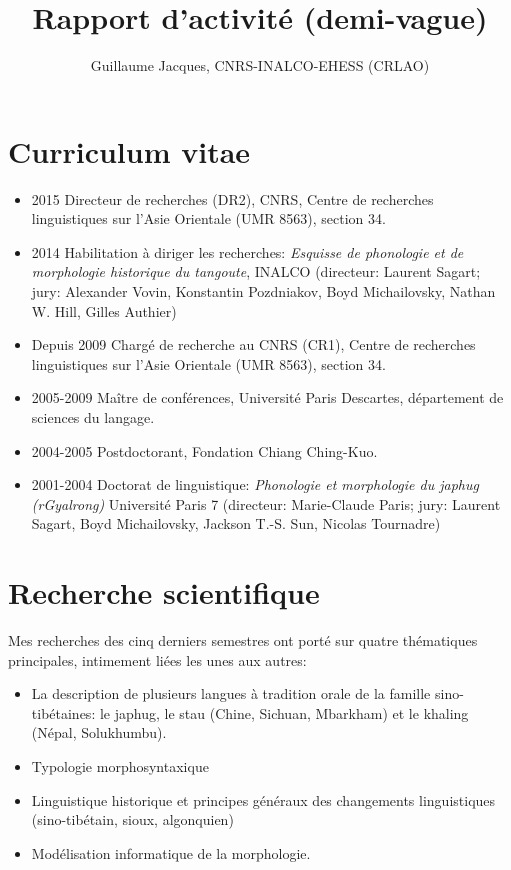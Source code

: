 \documentclass[oldfontcommands,oneside,a4paper,11pt]{article}
\begin{document}
  \title{Rapport d'activité (demi-vague)}
 
\author{Guillaume Jacques, CNRS-INALCO-EHESS (CRLAO)}
\maketitle
\sloppy


\section{Curriculum vitae}
\begin{itemize}
\item 2015 Directeur de recherches (DR2), CNRS, Centre de recherches linguistiques sur l'Asie Orientale (UMR 8563), section 34.
\item 2014 Habilitation à diriger les recherches: \textit{Esquisse de phonologie et de morphologie historique du tangoute}, INALCO  (directeur: Laurent Sagart; jury: Alexander Vovin, Konstantin Pozdniakov, Boyd Michailovsky, Nathan W. Hill, Gilles Authier)
\item Depuis 2009 Chargé de recherche au CNRS (CR1), Centre de recherches linguistiques sur l'Asie Orientale (UMR 8563), section 34.
\item 2005-2009 Maître de conférences, Université Paris Descartes, département de sciences du langage.
\item 2004-2005 Postdoctorant, Fondation Chiang Ching-Kuo.
\item 2001-2004 Doctorat de linguistique: \textit{Phonologie et morphologie du japhug (rGyalrong)} Université Paris 7 (directeur: Marie-Claude Paris; jury: Laurent Sagart, Boyd Michailovsky, Jackson T.-S. Sun, Nicolas Tournadre)
\end{itemize}
\section{Recherche scientifique}

Mes recherches des cinq derniers semestres ont porté sur quatre thématiques principales, intimement liées les unes aux autres:

\begin{itemize}
\item La description de plusieurs langues à tradition orale de la famille sino-tibétaines: le japhug, le stau (Chine, Sichuan, Mbarkham) et le khaling (Népal, Solukhumbu). 
\item Typologie morphosyntaxique
\item Linguistique historique et principes généraux des changements linguistiques (sino-tibétain, sioux, algonquien)
\item Modélisation informatique de la morphologie.
\end{itemize}
\end{document}
